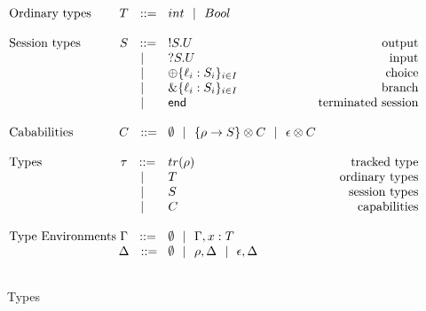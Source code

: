 \begin{figure}[H]
  \centering
  $
  	\arraycolsep=1pt
  	\begin{array}{lclr}
    \text{Ordinary types } & T \DEF & \tvar int \OR \tvar Bool \\
    \\

		\text{Session types} & S	\DEF &	\tout S U  & \text{output}\\
			& \OR	&	\tin S U & \text{input}\\
			& \OR	&	\tselI{\ell}{S} & \text{choice}\\
			& \OR	&	\tbranchI{\ell}{S} & \text{branch} \\
			& \OR	&	\tend & \text{terminated session}\\
      \\

    \text{Cababilities} & C \DEF & \econtext
       \OR  \{\rho \gto S \} \otimes C
       \OR  \epsilon \otimes C \\
    \\

    \text{Types} & \tau \DEF & tr(\rho) & \text{ tracked type} \\
         & \OR & T & \text{ ordinary types}\\
         & \OR & S &  \text{session types}\\
         & \OR & C & \text{capabilities}\\
      \\

    \text{Type Environments} & \Gamma \DEF & \econtext \bnfbar \Gamma, x: T  \\
         & \Delta \DEF &  \econtext \bnfbar \rho,\Delta \bnfbar \epsilon,\Delta\\
      \\
    \end{array}
	$
\caption{Types}\label{types}
\end{figure}
